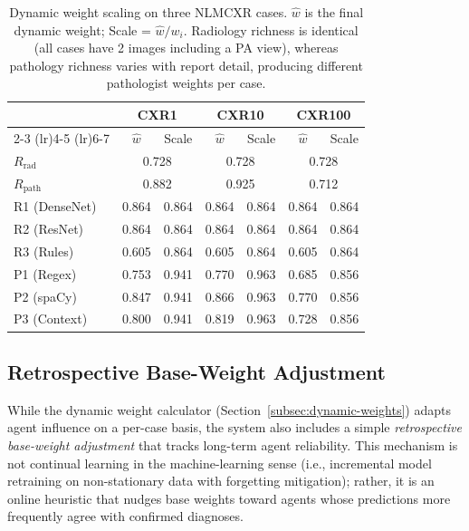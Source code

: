 \documentclass[12pt]{article}
\begin{document}
\begin{table}[ht]
\centering
\small
\begin{tabular}{lcccccc}
\toprule
& \multicolumn{2}{c}{\textbf{CXR1}} & \multicolumn{2}{c}{\textbf{CXR10}} & \multicolumn{2}{c}{\textbf{CXR100}} \\
\cmidrule(lr){2-3} \cmidrule(lr){4-5} \cmidrule(lr){6-7}
& $\hat{w}$ & Scale & $\hat{w}$ & Scale & $\hat{w}$ & Scale \\
\midrule
$R_\text{rad}$ & \multicolumn{2}{c}{0.728} & \multicolumn{2}{c}{0.728} & \multicolumn{2}{c}{0.728} \\
$R_\text{path}$ & \multicolumn{2}{c}{\cellcolor{yellow!25}0.882} & \multicolumn{2}{c}{\cellcolor{green!20}0.925} & \multicolumn{2}{c}{\cellcolor{red!15}0.712} \\
\midrule
R1 (DenseNet) & 0.864 & 0.864 & 0.864 & 0.864 & 0.864 & 0.864 \\
R2 (ResNet)   & 0.864 & 0.864 & 0.864 & 0.864 & 0.864 & 0.864 \\
R3 (Rules)    & 0.605 & 0.864 & 0.605 & 0.864 & 0.605 & 0.864 \\
P1 (Regex)    & \cellcolor{yellow!25}0.753 & 0.941 & \cellcolor{green!20}0.770 & 0.963 & \cellcolor{red!15}0.685 & 0.856 \\
P2 (spaCy)    & \cellcolor{yellow!25}0.847 & 0.941 & \cellcolor{green!20}0.866 & 0.963 & \cellcolor{red!15}0.770 & 0.856 \\
P3 (Context)  & \cellcolor{yellow!25}0.800 & 0.941 & \cellcolor{green!20}0.819 & 0.963 & \cellcolor{red!15}0.728 & 0.856 \\
\bottomrule
\end{tabular}
\caption{Dynamic weight scaling on three NLMCXR cases. $\hat{w}$ is the final dynamic weight; Scale = $\hat{w}/w_i$. Radiology richness is identical (all cases have 2 images including a PA view), whereas pathology richness varies with report detail, producing different pathologist weights per case.}
\label{tab:dynamic-weights-example}
\end{table}

\subsection{Retrospective Base-Weight Adjustment}
\label{subsec:continual-learning}

While the dynamic weight calculator (Section~\ref{subsec:dynamic-weights}) adapts agent influence on a per-case basis, the system also includes a simple \emph{retrospective base-weight adjustment} that tracks long-term agent reliability. This mechanism is not continual learning in the machine-learning sense (i.e., incremental model retraining on non-stationary data with forgetting mitigation); rather, it is an online heuristic that nudges base weights toward agents whose predictions more frequently agree with confirmed diagnoses.
\end{document}
